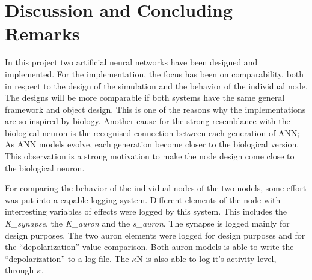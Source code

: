 \documentclass[b5paper,11 pt]{report}
\begin{document}
	

	

	



\chapter{Discussion and Concluding Remarks} 	%
	\label{chapterComparisonAndResults}

	In this project two artificial neural networks have been designed and implemented. 
	For the implementation, the focus has been on comparability, both in respect to the design of the simulation and the behavior of the individual node.
	The designs will be more comparable if both systems have the same general framework and object design. 
	This is one of the reasons why the implementations are so inspired by biology.
	Another cause for the strong resemblance with the biological neuron is the recognised connection between each generation of ANN; 
		As ANN models evolve, each generation become closer to the biological version. %
	This observation is a strong motivation to make the node design come close to the biological neuron.

	For comparing the behavior of the individual nodes of the two nodels, some effort was put into a capable logging system. 
	Different elements of the node with interresting variables of effects were logged by this system. This includes the \emph{K\_synapse}, the \emph{K\_auron} and the \emph{s\_auron}.
	The synapse is logged mainly for design purposes. The two auron elements were logged for design purposes and for the ``depolarization'' value comparison.
	Both auron models is able to write the ``depolarization'' to a log file. The $\kappa$N is also able to log it's activity level, through $\kappa$.
\end{document}
